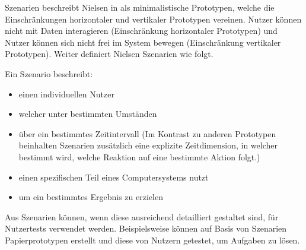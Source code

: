 Szenarien beschreibt Nielsen in \cite[S.~99]{Nielsen1994} als minimalistische Prototypen, welche die Einschränkungen horizontaler und vertikaler Prototypen vereinen. 
Nutzer können nicht mit Daten interagieren (Einschränkung horizontaler Prototypen) und Nutzer können sich nicht frei im System bewegen (Einschränkung vertikaler Prototypen).
 \cite[S.~100]{Nielsen1994} Weiter definiert Nielsen Szenarien wie folgt. 
 
 Ein Szenario beschreibt:

\begin{itemize}
	\item einen individuellen Nutzer
	\item welcher unter bestimmten Umständen
	\item über ein bestimmtes Zeitintervall (Im Kontrast zu anderen Prototypen beinhalten Szenarien zusätzlich eine explizite Zeitdimension, in welcher bestimmt wird, welche Reaktion auf eine bestimmte Aktion folgt.)
	\item einen spezifischen Teil eines Computersystems nutzt
	\item um ein bestimmtes Ergebnis zu erzielen
\end{itemize}

 \cite[S.~101]{Nielsen1994} Aus Szenarien können, wenn diese ausreichend detailliert gestaltet sind, für Nutzertests verwendet werden. Beispielsweise können auf Basis von Szenarien Papierprototypen erstellt und diese von Nutzern getestet, um Aufgaben zu lösen. 






